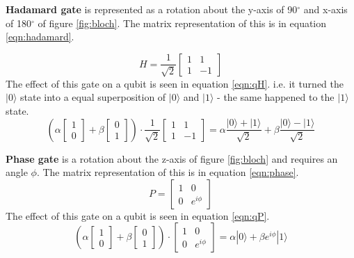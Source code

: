 {\bf Hadamard gate} is represented as a rotation about the y-axis of 90$^\circ$ and x-axis of 180$^\circ$ of figure \ref{fig:bloch}.
The matrix representation of this is in equation \ref{eqn:hadamard}. 

\begin{equation}\label{eqn:hadamard}
    H = \frac{1}{\sqrt{2}} \begin{bmatrix}
1 & 1 \\
1 & -1 
\end{bmatrix}  
\end{equation}
The effect of this gate on a qubit is seen in equation \ref{eqn:qH}.
i.e. it turned the $|0\rangle$ state into a equal superposition of $|0\rangle$ and $|1\rangle$ - the same happened to the $|1\rangle$ state.
\begin{equation}\label{eqn:qH}
    \left( \alpha \begin{bmatrix}
1 \\
0 
\end{bmatrix}  + \beta  \begin{bmatrix}
0 \\
1 
\end{bmatrix}   \right) \cdot \frac{1}{\sqrt{2}} \begin{bmatrix}
1 & 1 \\
1 & -1 
\end{bmatrix} = \alpha \frac{|0\rangle +|1\rangle}{\sqrt{2}} + \beta \frac{|0\rangle - |1\rangle}{\sqrt{2}}
\end{equation}


{\bf Phase gate} is a rotation about the z-axis of figure \ref{fig:bloch} and requires an angle $\phi$. 
The matrix representation of this is in equation \ref{eqn:phase}.
\begin{equation}\label{eqn:phase}
    P =  \begin{bmatrix}
1 & 0 \\
0 & e^{i \phi}
\end{bmatrix}  
\end{equation}
The effect of this gate on a qubit is seen in equation \ref{eqn:qP}.
\begin{equation}\label{eqn:qP}
    \left( \alpha \begin{bmatrix}
1 \\
0 
\end{bmatrix}  + \beta  \begin{bmatrix}
0 \\
1 
\end{bmatrix}   \right) \cdot \begin{bmatrix}
1 & 0 \\
0 & e^{i\phi} 
\end{bmatrix}  = \alpha |0\rangle + \beta e^{i\phi}|1\rangle
\end{equation}

